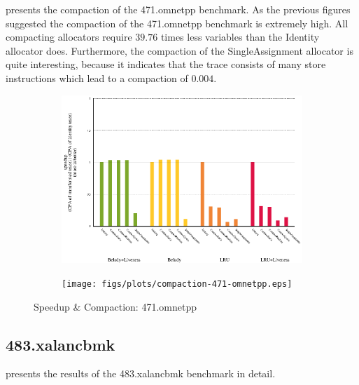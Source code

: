 \documentclass[onecolumn, openright, master, english, signatures]{dbrgrptt}
\begin{document}
 presents the compaction of the 471.omnetpp benchmark. As the previous figures suggested the compaction of the 471.omnetpp benchmark is extremely high. All compacting allocators require $39.76$ times less variables than the Identity allocator does. Furthermore, the compaction of the SingleAssignment allocator is quite interesting, because it indicates that the \ac{trace} consists of many store instructions which lead to a compaction of $0.004$.

\begin{figure}[!ht]
  \begin{subfigure}[b]{0.5\textwidth}%
    \includegraphics[width=\textwidth]{figs/plots/speedup-471-omnetpp.eps}
    \label{fig:speedup-compaction-471-omnetpp-speedup}
  \end{subfigure}%
  \begin{subfigure}[b]{0.5\textwidth}%
    \texttt{[image: figs/plots/compaction-471-omnetpp.eps]}
    \label{fig:speedup-compaction-471-omnetpp-compaction}
  \end{subfigure}%
  \caption{Speedup \& Compaction: 471.omnetpp}
  \label{fig:speedup-compaction-471-omnetpp}
\end{figure}

\subsection{483.xalancbmk}

 presents the results of the 483.xalancbmk benchmark in detail.
\end{document}
